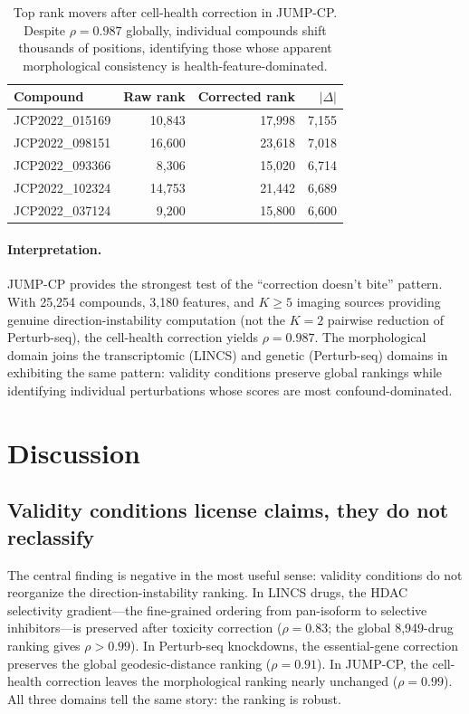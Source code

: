 \documentclass{article}
\begin{document}
\begin{table}[t]
\centering
\caption{Top rank movers after cell-health correction in JUMP-CP. Despite
$\rho = 0.987$ globally, individual compounds shift thousands of positions,
identifying those whose apparent morphological consistency is
health-feature-dominated.}
\label{tab:jump_movers}
\small
\begin{tabular}{lrrr}
\toprule
Compound & Raw rank & Corrected rank & $|\Delta|$ \\
\midrule
JCP2022\_015169 & 10{,}843 & 17{,}998 & 7{,}155 \\
JCP2022\_098151 & 16{,}600 & 23{,}618 & 7{,}018 \\
JCP2022\_093366 & 8{,}306 & 15{,}020 & 6{,}714 \\
JCP2022\_102324 & 14{,}753 & 21{,}442 & 6{,}689 \\
JCP2022\_037124 & 9{,}200 & 15{,}800 & 6{,}600 \\
\bottomrule
\end{tabular}
\end{table}

\paragraph{Interpretation.}
JUMP-CP provides the strongest test of the ``correction doesn't bite''
pattern. With 25{,}254 compounds, 3{,}180 features, and $K \geq 5$ imaging
sources providing genuine direction-instability computation (not the $K = 2$
pairwise reduction of Perturb-seq), the cell-health correction yields $\rho
= 0.987$. The morphological domain joins the transcriptomic (LINCS) and
genetic (Perturb-seq) domains in exhibiting the same pattern: validity
conditions preserve global rankings while identifying individual
perturbations whose scores are most confound-dominated.

\section{Discussion}

\subsection{Validity conditions license claims, they do not reclassify}

The central finding is negative in the most useful sense: validity conditions
do not reorganize the direction-instability ranking. In LINCS drugs, the
HDAC selectivity gradient---the fine-grained ordering from pan-isoform to
selective inhibitors---is preserved after toxicity correction ($\rho =
0.83$; the global 8{,}949-drug ranking gives $\rho > 0.99$). In Perturb-seq
knockdowns, the essential-gene correction preserves the global
geodesic-distance ranking ($\rho = 0.91$). In JUMP-CP, the cell-health
correction leaves the morphological ranking nearly unchanged ($\rho =
0.99$). All three domains tell the same story: the ranking is robust.
\end{document}
